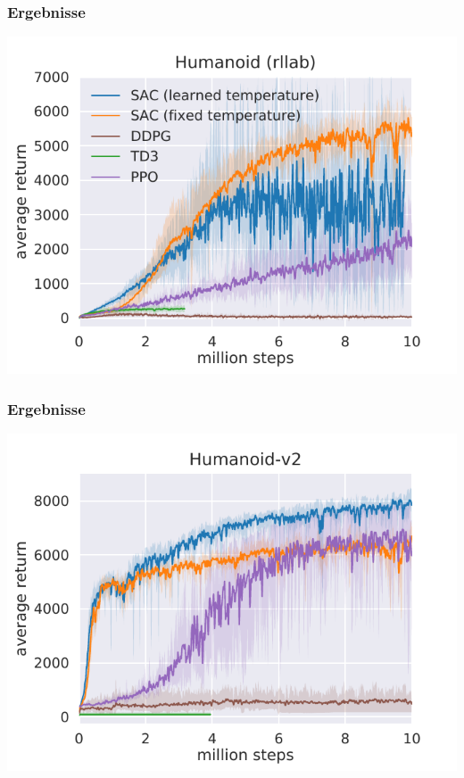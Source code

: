 \begin{frame}
    \frametitle{Ergebnisse}
    \includegraphics[scale=0.8]{figures/humanoid-rllab.pdf}
\end{frame}
\begin{frame}
    \frametitle{Ergebnisse}
    \includegraphics[scale=0.8]{figures/humanoid-gym.pdf}
\end{frame}
